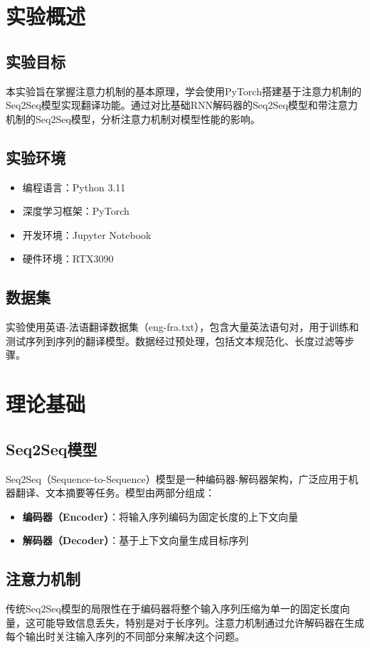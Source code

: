 \documentclass[a4paper]{article}
\begin{document}
\section{实验概述}
\subsection{实验目标}
本实验旨在掌握注意力机制的基本原理，学会使用PyTorch搭建基于注意力机制的Seq2Seq模型实现翻译功能。通过对比基础RNN解码器的Seq2Seq模型和带注意力机制的Seq2Seq模型，分析注意力机制对模型性能的影响。

\subsection{实验环境}
\begin{itemize}
    \item 编程语言：Python 3.11
    \item 深度学习框架：PyTorch
    \item 开发环境：Jupyter Notebook
    \item 硬件环境：RTX3090
\end{itemize}

\subsection{数据集}
实验使用英语-法语翻译数据集（eng-fra.txt），包含大量英法语句对，用于训练和测试序列到序列的翻译模型。数据经过预处理，包括文本规范化、长度过滤等步骤。

\section{理论基础}
\subsection{Seq2Seq模型}
Seq2Seq（Sequence-to-Sequence）模型是一种编码器-解码器架构，广泛应用于机器翻译、文本摘要等任务。模型由两部分组成：
\begin{itemize}
    \item \textbf{编码器（Encoder）}：将输入序列编码为固定长度的上下文向量
    \item \textbf{解码器（Decoder）}：基于上下文向量生成目标序列
\end{itemize}

\subsection{注意力机制}
传统Seq2Seq模型的局限性在于编码器将整个输入序列压缩为单一的固定长度向量，这可能导致信息丢失，特别是对于长序列。注意力机制通过允许解码器在生成每个输出时关注输入序列的不同部分来解决这个问题。
\end{document}
